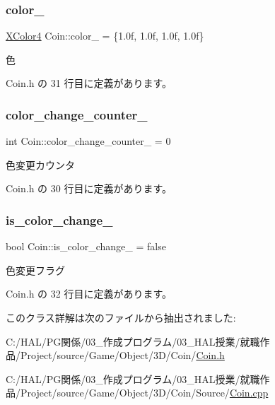 \subsubsection{\texorpdfstring{color\+\_\+}{color\_}}
{\footnotesize\ttfamily \mbox{\hyperlink{_vector3_d_8h_a680c30c4a07d86fe763c7e01169cd6cc}{X\+Color4}} Coin\+::color\+\_\+ = \{1.\+0f, 1.\+0f, 1.\+0f, 1.\+0f\}\hspace{0.3cm}{\ttfamily [private]}}



色 



 Coin.\+h の 31 行目に定義があります。

\mbox{\label{class_coin_a878d12620757966eb5f428d5daca1300}} 
\subsubsection{\texorpdfstring{color\+\_\+change\+\_\+counter\+\_\+}{color\_change\_counter\_}}
{\footnotesize\ttfamily int Coin\+::color\+\_\+change\+\_\+counter\+\_\+ = 0\hspace{0.3cm}{\ttfamily [private]}}



色変更カウンタ 



 Coin.\+h の 30 行目に定義があります。

\mbox{\label{class_coin_a291ad958579e6b0c94c928acef25d035}} 
\subsubsection{\texorpdfstring{is\+\_\+color\+\_\+change\+\_\+}{is\_color\_change\_}}
{\footnotesize\ttfamily bool Coin\+::is\+\_\+color\+\_\+change\+\_\+ = false\hspace{0.3cm}{\ttfamily [private]}}



色変更フラグ 



 Coin.\+h の 32 行目に定義があります。



このクラス詳解は次のファイルから抽出されました\+:\begin{DoxyCompactItemize}
\item 
C\+:/\+H\+A\+L/\+P\+G関係/03\+\_\+作成プログラム/03\+\_\+\+H\+A\+L授業/就職作品/\+Project/source/\+Game/\+Object/3\+D/\+Coin/\mbox{\hyperlink{_coin_8h}{Coin.\+h}}\item 
C\+:/\+H\+A\+L/\+P\+G関係/03\+\_\+作成プログラム/03\+\_\+\+H\+A\+L授業/就職作品/\+Project/source/\+Game/\+Object/3\+D/\+Coin/\+Source/\mbox{\hyperlink{_coin_8cpp}{Coin.\+cpp}}\end{DoxyCompactItemize}

